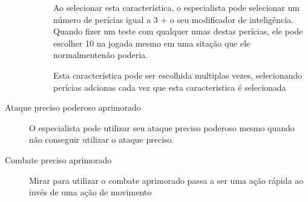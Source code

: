 \begin{description}
\begin{description}
Ao selecionar esta caracter\'istica, o especialista pode selecionar
um n\'umero de per\'icias igual a 3 + o seu modificador de
intelig\^encia. Quando fizer um teste com qualquer umas destas
per\'icias, ele pode escolher 10 na jogada mesmo em uma
sita\c{c}\~ao que ele normalmenten\~ao poderia.

Esta caracter\'istica pode ser escolhida multiplas vezes, selecionando
per\'icias adcionas cada vez que esta caracteristica \'e selecionada
\end{description}

\item[Ataque preciso poderoso aprimorado]
O especialista pode utilizar seu ataque preciso poderoso mesmo quando
n\~ao conseguir utilizar o ataque preciso.

\item[Combate preciso aprimorado]
Mirar para utilizar o combate aprimorado passa a ser uma
a\c{c}\~ao r\'apida ao inv\'es de uma a\c{c}\~ao de movimento

\end{description}

